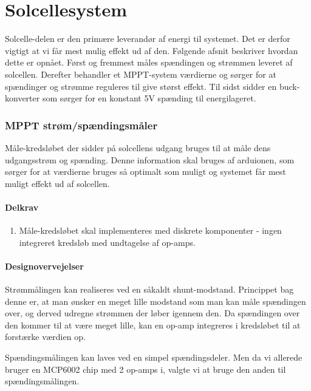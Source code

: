 \documentclass[../main.tex]{subfiles}
\begin{document}
\chapter{Solcellesystem} \label{Chap:Solcellesystem}
Solcelle-delen er den primære leverandør af energi til systemet. Det er derfor vigtigt at vi får mest mulig effekt ud af den. Følgende afsnit beskriver hvordan dette er opnået. Først og fremmest måles spændingen og strømmen leveret af solcellen. Derefter behandler et MPPT-system værdierne og sørger for at spændinger og strømme reguleres til give størst effekt. Til sidst sidder en buck-konverter som sørger for en konstant 5V spænding til energilageret.

\subsection{MPPT strøm/spændingsmåler}
    Måle-kredsløbet der sidder på solcellens udgang bruges til at måle dens udgangsstrøm og spænding. Denne information skal bruges af arduionen, som sørger for at værdierne bruges så optimalt som muligt og systemet får mest muligt effekt ud af solcellen.
            
        \subsubsection{Delkrav}

        \begin{enumerate}
                \item Måle-kredsløbet skal implementeres med diskrete komponenter - ingen integreret kredsløb med undtagelse af op-amps.
        \end{enumerate}
        
        \subsubsection{Designovervejelser}
        Strømmålingen kan realiseres ved en såkaldt shunt-modstand. Princippet bag denne er, at man ønsker en meget lille modstand som man kan måle spændingen over, og derved udregne strømmen der løber igennem den. Da spændingen over den kommer til at være meget lille, kan en op-amp integreres i kredsløbet til at forstærke værdien op.

        Spændingsmålingen kan laves ved en simpel spændingsdeler. Men da vi allerede bruger en MCP6002 chip med 2 op-amps i, valgte vi at bruge den anden til spændingsmålingen.
\end{document}
